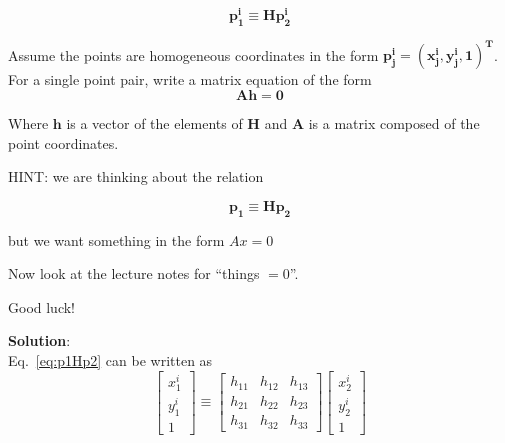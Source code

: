 \documentclass[12pt]{article}
\begin{document}
\begin{equation}
\bm{p^i_1 \equiv Hp^i_2}
\label{eq:p1Hp2}
\end{equation}

Assume the points are homogeneous coordinates in the form $\bm{p^i_j = (x^i_j,y^i_j,1)^T}$. For a single point pair, write a matrix
equation of the form
\begin{equation}
  \bm{Ah = 0}
\end{equation}

Where $\bm{h}$ is a vector of the elements of $\bm{H}$ and $\bm{A}$ is a matrix composed of the point coordinates.

HINT: we are thinking about the relation

\begin{equation}
\bm{p_1 \equiv Hp_2}
\end{equation}

but we want something in the form $Ax = 0$

Now look at the lecture notes for ``things $=0$''.

Good luck!

\textbf{Solution}:\\
Eq.~\ref{eq:p1Hp2} can be written as
\begin{equation}
 \left[ \begin{matrix}
	 x_1^i\\
	 y_1^i\\
	 1
 \end{matrix} \right]
 \equiv 
 \left[ \begin{matrix}
     h_{11} & h_{12} & h_{13} \\
     h_{21} & h_{22} & h_{23} \\
     h_{31} & h_{32} & h_{33}
 \end{matrix} \right]
 \left[ \begin{matrix}
	 x_2^i\\
	 y_2^i\\
	 1
 \end{matrix} \right]
\end{equation}
\end{document}
